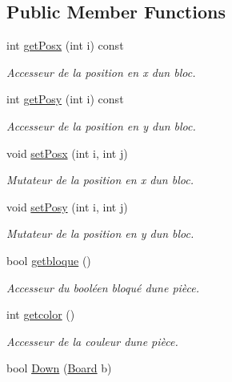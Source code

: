 \subsection*{Public Member Functions}
\begin{DoxyCompactItemize}
\item 
int \hyperlink{classPiece_a0af5276d26a4bb2a6a42a3dab8b4783f}{get\+Posx} (int i) const
\begin{DoxyCompactList}\small\item\em Accesseur de la position en x d\textquotesingle{}un bloc. \end{DoxyCompactList}\item 
int \hyperlink{classPiece_a24ca14604d394b821bf89d690c6de477}{get\+Posy} (int i) const
\begin{DoxyCompactList}\small\item\em Accesseur de la position en y d\textquotesingle{}un bloc. \end{DoxyCompactList}\item 
void \hyperlink{classPiece_a2c6f76d78f5c448ba42b11f0b2af12f8}{set\+Posx} (int i, int j)
\begin{DoxyCompactList}\small\item\em Mutateur de la position en x d\textquotesingle{}un bloc. \end{DoxyCompactList}\item 
void \hyperlink{classPiece_a53af32e68bb73e5ed23f3ac96a9d1516}{set\+Posy} (int i, int j)
\begin{DoxyCompactList}\small\item\em Mutateur de la position en y d\textquotesingle{}un bloc. \end{DoxyCompactList}\item 
bool \hyperlink{classPiece_aa5f13b2ce17fdf29dca28b0455f7b73a}{getbloque} ()
\begin{DoxyCompactList}\small\item\em Accesseur du booléen bloqué d\textquotesingle{}une pièce. \end{DoxyCompactList}\item 
int \hyperlink{classPiece_a2160d48bd04821ebbab32e14728360ad}{getcolor} ()
\begin{DoxyCompactList}\small\item\em Accesseur de la couleur d\textquotesingle{}une pièce. \end{DoxyCompactList}\item 
bool \hyperlink{classPiece_ad48708c0bbee0b0a583f00e56808b1d2}{Down} (\hyperlink{classBoard}{Board} b)

\end{DoxyCompactItemize}

